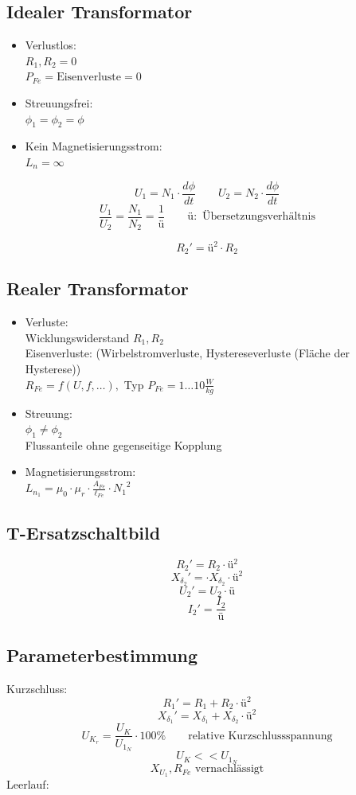 \subsection{Idealer Transformator}
\begin{itemize}
  \item Verlustlos: \\
        $R_1, R_2 = 0$ \\
        $P_{Fe} = \text{Eisenverluste} = 0$
  \item Streuungsfrei: \\
        $\phi_1 = \phi_2 = \phi$
  \item Kein Magnetisierungsstrom: \\
        $L_n = \infty$
\end{itemize}
\[ U_1 = N_1 \cdot \frac{d \phi}{d t} \qquad U_2 = N_2 \cdot \frac{d \phi}{d t} \]
\[ \frac{U_1}{U_2} = \frac{N_1}{N_2} = \frac{1}{ü} \qquad ü:\text{ Übersetzungsverhältnis} \]

\[ R_2' = ü^2 \cdot R_2 \]

\subsection{Realer Transformator}
\begin{itemize}
  \item Verluste: \\
        Wicklungswiderstand $R_1, R_2$ \\
        Eisenverluste: 
        (Wirbelstromverluste, Hystereseverluste (Fläche der Hysterese)) \\
        $R_{Fe} = f(U, f, \dots), $ Typ $P_{Fe} = 1 \dots 10 \frac{W}{kg}$
  \item Streuung: \\
        $\phi_1 \neq \phi_2$ \\
        Flussanteile ohne gegenseitige Kopplung 
  \item Magnetisierungsstrom: \\
        $L_{n_1} 
        = \mu_0 \cdot \mu_r \cdot \frac{A_{Fe}}{\ell_{Fe}} \cdot {N_1}^2$
\end{itemize}

\subsection{T-Ersatzschaltbild}
\[ R_2' = R_2 \cdot ü^2 \]
\[ X_{\delta_2}' = \cdot X_{\delta_2} \cdot ü^2 \]
\[ U_2' = U_2 \cdot ü \]
\[ I_2' = \frac{I_2}{ü} \]

\subsection{Parameterbestimmung}
Kurzschluss: 
\[ R_1' = R_1 + R_2 \cdot ü^2 \]
\[ X_{\delta_1}' = X_{\delta_1} + X_{\delta_2} \cdot ü^2 \]
\[ U_{K_r} = \frac{U_K}{U_{1_N}} \cdot 100 \% 
\qquad \text{relative Kurzschlussspannung} \]
\[ U_K << U_{1_N}  \]
\[ X_{U_1}, R_{Fe} \text{ vernachlässigt} \]
Leerlauf: 